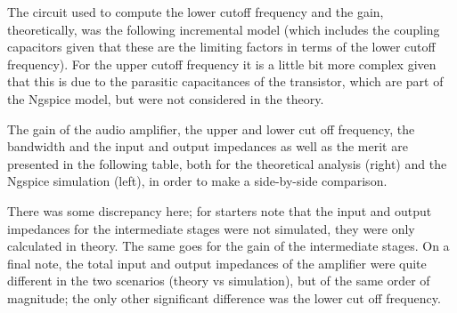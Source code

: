 %    
The circuit used to compute the lower cutoff frequency and the gain, theoretically, was the following incremental model (which includes the coupling capacitors given that these are the limiting factors in terms of the lower cutoff frequency). For the upper cutoff frequency it is a little bit more complex given that this is due to the parasitic capacitances of the transistor, which are part of the Ngspice model, but were not considered in the theory.\par 



The gain of the audio amplifier, the upper and lower cut off frequency, the bandwidth and the input and output impedances as well as the merit are presented in the following table, both for the theoretical analysis (right) and the Ngspice simulation (left), in order to make a side-by-side comparison.\par


%    
  

There was some discrepancy here; for starters note that the input and output impedances for the intermediate stages were not simulated, they were only calculated in theory. The same goes for the gain of the intermediate stages. On a final note, the total input and output impedances of the amplifier were quite different in the two scenarios (theory vs simulation), but of the same order of magnitude; the only other significant difference was the lower cut off frequency.\par

